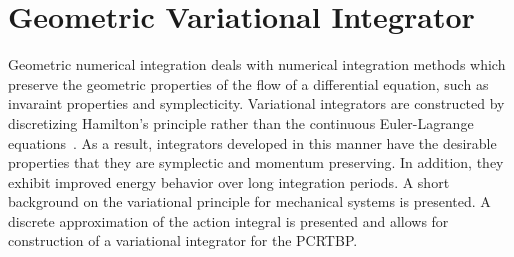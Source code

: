 \documentclass[letterpaper, preprint, paper,11pt]{AAS}	%
\begin{document}
\section{Geometric Variational Integrator}\label{sec:discrete_var}
Geometric numerical integration deals with numerical integration methods which preserve the geometric properties of the flow of a differential equation, such as invaraint properties and symplecticity.
Variational integrators are constructed by discretizing Hamilton's principle rather than the continuous Euler-Lagrange equations~\cite{marsden2001}.
As a result, integrators developed in this manner have the desirable properties that they are symplectic and momentum preserving.
In addition, they exhibit improved energy behavior over long integration periods.
A short background on the variational principle for mechanical systems is presented. 
A discrete approximation of the action integral is presented and allows for construction of a variational integrator for the PCRTBP.
\end{document}
